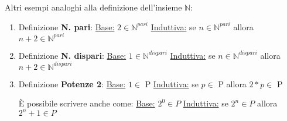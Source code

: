\begin{example}
    Altri esempi analoghi alla definizione dell'insieme $\mathbb{N}$:
    \begin{enumerate}
        \item Definizione \textbf{N. pari}: \hspace{.3cm} \underline{Base:} $2 \in \mathbb{N}^{pari}$ \hspace{.3cm} \underline{Induttiva:} se $n \in \mathbb{N}^{pari}$ allora $n+2 \in \mathbb{N}^{pari}$
        \item Definizione \textbf{N. dispari}: \hspace{.1cm} \underline{Base:} $1 \in \mathbb{N}^{dispari}$ \hspace{.2cm} \underline{Induttiva:} se $n \in \mathbb{N}^{dispari}$ allora $n+2 \in \mathbb{N}^{dispari}$
        \item Definizione \textbf{Potenze 2}: \hspace{.2cm} \underline{Base:} $1 \in$ P \hspace{.2cm} \underline{Induttiva:} se $p \in$ P allora $2*p \in$ P
        
        È possibile scrivere anche come: \hspace{.2cm} \underline{Base:} $2^0 \in P$ \hspace{.2cm} \underline{Induttiva:} se $2^n \in P$ allora $2^n+1 \in P$
    \end{enumerate}
\end{example}

